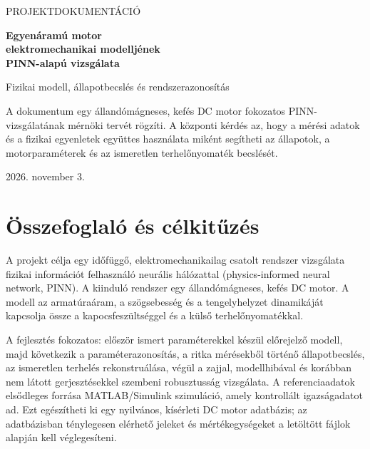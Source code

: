 \documentclass[11pt,a4paper]{article}
\providecommand*{\theHpage}{\thepage}
\begin{document}
\hypersetup{pageanchor=false}
\begin{titlepage}
\centering
\vspace*{18mm}
{\Large\color{teal} PROJEKTDOKUMENTÁCIÓ\par}
\vspace{12mm}
{\huge\bfseries\color{navy} Egyenáramú motor\\[2mm] elektromechanikai modelljének\\[2mm] PINN-alapú vizsgálata\par}
\vspace{9mm}
{\Large Fizikai modell, állapotbecslés és rendszerazonosítás\par}
\vspace{20mm}
\begin{minipage}{0.83\textwidth}
\large
A dokumentum egy állandómágneses, kefés DC motor fokozatos PINN-vizsgálatának mérnöki tervét rögzíti. A központi kérdés az, hogy a mérési adatok és a fizikai egyenletek együttes használata miként segítheti az állapotok, a motorparaméterek és az ismeretlen terhelőnyomaték becslését.
\end{minipage}
\vfill
{\large 2026. november 3.\par}
\vspace{5mm}
\end{titlepage}

\hypersetup{pageanchor=true}
\renewcommand*{\theHpage}{roman.\roman{page}}
\tableofcontents
\newpage
{}
\renewcommand*{\theHpage}{arabic.\arabic{page}}

\section{Összefoglaló és célkitűzés}

A projekt célja egy időfüggő, elektromechanikailag csatolt rendszer vizsgálata fizikai információt felhasználó neurális hálózattal (physics-informed neural network, PINN). A kiinduló rendszer egy állandómágneses, kefés DC motor. A modell az armatúraáram, a szögsebesség és a tengelyhelyzet dinamikáját kapcsolja össze a kapocsfeszültséggel és a külső terhelőnyomatékkal.

A fejlesztés fokozatos: először ismert paraméterekkel készül előrejelző modell, majd következik a paraméterazonosítás, a ritka mérésekből történő állapotbecslés, az ismeretlen terhelés rekonstruálása, végül a zajjal, modellhibával és korábban nem látott gerjesztésekkel szembeni robusztusság vizsgálata. A referenciaadatok elsődleges forrása MATLAB/Simulink szimuláció, amely kontrollált igazságadatot ad. Ezt egészítheti ki egy nyilvános, kísérleti DC motor adatbázis; az adatbázisban ténylegesen elérhető jeleket és mértékegységeket a letöltött fájlok alapján kell véglegesíteni.
\end{document}
